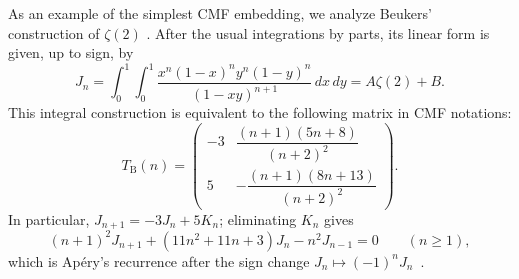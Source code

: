 \documentclass[oneside,english,11pt]{amsart}
\begin{document}
As an example of the simplest CMF embedding, we analyze Beukers' construction of $\zeta(2)$ \cite{beukers1979note}. After the usual integrations by parts, its linear form is given, up to sign, by
\[
    J_n=
    \int_0^1\!\int_0^1
    \frac{x^n(1-x)^n y^n(1-y)^n}
         {(1-xy)^{n+1}}\,dx\,dy = A\zeta(2)+B.
\]
This integral construction is equivalent to the following matrix in CMF notations:
\begin{equation}
 T_{\mathrm B}(n)=
 \begin{pmatrix}
 -3 & \dfrac{(n+1)(5n+8)}{(n+2)^2}\\[5pt]
 5 & -\dfrac{(n+1)(8n+13)}{(n+2)^2}
 \end{pmatrix}.
 \label{eq:beukers-integral-trajectory}
\end{equation}
In particular, $J_{n+1}=-3J_n+5K_n$; eliminating $K_n$ gives
\[
 (n+1)^2J_{n+1}+(11n^2+11n+3)J_n-n^2J_{n-1}=0
 \qquad(n\ge1),
\]
which is Ap\'ery's recurrence after the sign change $J_n\mapsto(-1)^nJ_n$~\cite{jainTzermias2005}.
\end{document}
